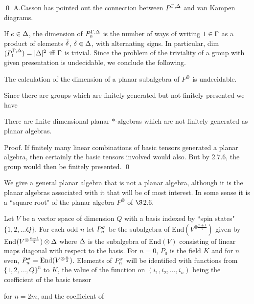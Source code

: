\qed
A.Casson has pointed out the connection between
$P^{\Gamma,\Delta}$ and van Kampen diagrams.

\bigskip
If $e\in\Delta$, the dimension of $P^{\Gamma,\Delta}_n$ is the number of ways
of writing $1\in\Gamma$ as a product of elements $\tilde{\delta}$,
$\delta\in\Delta$, with alternating signs. In particular,
dim$(P^{\Gamma,\Delta}_1)=|\Delta|^2$ iff $\Gamma$ is trivial. Since the problem of
the triviality of a group with given presentation is undecidable,
we conclude the following.

\bs{} The calculation of the dimension of a
planar subalgebra of $P^{\otimes}$ is undecidable.

\bs
Since there are
groups which are finitely generated but not finitely presented we
have

\bs{} There are finite dimensional
planar $*$-algebras which are not finitely generated as planar
algebras.

\bs
{\sc Proof}. If finitely many linear combinations of basic tensors
generated a planar algebra, then certainly the basic tensors
involved would also. But by 2.7.6, the group would then be finitely
presented. \qed

We give a general planar algebra that is not a planar algebra, although it
is the planar algebras associated with it that will be of most
interest. In some sense it is a ``square root" of the planar
algebra $P^{\otimes}$ of $\S$2.6.

Let $V$ be a vector space of dimension $Q$ with a basis indexed by
``spin states" $\{1,2,\dots Q\}$. For each odd $n$ let $P^\sigma_n$ be
the subalgebra of End$(V^{\otimes\frac{n+1}{2}})$ given by
End$(V^{\otimes\frac{n-1}{2}})\otimes\Delta$ where $\Delta$ is the
subalgebra of End$(V)$ consisting of linear maps diagonal with
respect to the basis. For $n=0$, $P_0$ is the field $K$ and for $n$
even, $P^\sigma_n={\bf\rm{End}}(V^{\otimes\frac{n}{2}})$. Elements of
$P^\sigma_n$ will be identified with functions from $\{1,2,\dots ,Q\}^n$
to $K$, the value of the function on $(i_1,i_2,\dots ,i_n)$ being
the coefficient of the basic tensor

for
$n=2m$, and the coefficient of

